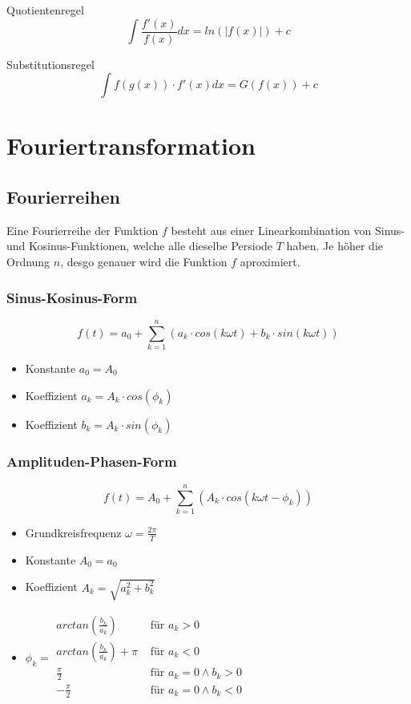 Quotientenregel
\[ \int \frac{f'(x)}{f(x)}dx = ln(|f(x)|) + c\]

Substitutionsregel
\[ \int f(g(x)) \cdot f'(x) dx = G(f(x)) + c\]


\section{Fouriertransformation}
\subsection{Fourierreihen}
Eine Fourierreihe der Funktion $f$ besteht aus einer Linearkombination
von Sinus- und Kosinus-Funktionen, welche alle dieselbe Persiode $T$
haben. Je höher die Ordnung $n$, desgo genauer wird die Funktion $f$ aproximiert.

\subsubsection{Sinus-Kosinus-Form}
\[
  f(t) = a_0 + \sum_{k=1}^{n}
  (a_k \cdot cos(k \omega t) + b_k \cdot sin(k \omega t))
\]
\begin{itemize}
  \item Konstante $a_0 = A_0$
  \item Koeffizient $a_k = A_k \cdot cos(\phi_k)$
  \item Koeffizient $b_k = A_k \cdot sin(\phi_k)$
\end{itemize}

\subsubsection{Amplituden-Phasen-Form}
\[
  f(t) = A_0 + \sum_{k=1}^{n}
  (A_k \cdot cos(k \omega t  - \phi_k))
\]
\begin{itemize}
  \item Grundkreisfrequenz $\omega = \frac{2\pi}{T}$
  \item Konstante $A_0 = a_0$
  \item Koeffizient $A_k = \sqrt{a_k^2 + b_k^2}$
  \item $\phi_k =  \begin{array}{ll}
      arctan\left(\frac{b_k}{a_k}\right) & \text{ für } a_k > 0 \\
      arctan\left(\frac{b_k}{a_k}\right) + \pi & \text{ für } a_k < 0 \\
      \frac{\pi}{2} & \text{ für } a_k = 0 \wedge b_k > 0\\
      -\frac{\pi}{2} & \text{ für } a_k = 0 \wedge b_k < 0\\
    \end{array}$
\end{itemize}

